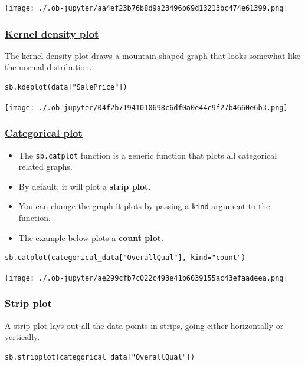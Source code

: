\documentclass[11pt]{article}
\begin{document}
\begin{center}
\texttt{[image: ./.ob-jupyter/aa4ef23b76b8d9a23496b69d13213bc474e61399.png]}
\label{orgf9e3f4a}
\end{center}

 \newpage
\subsubsection{\href{https://seaborn.pydata.org/generated/seaborn.kdeplot.html}{Kernel density plot}}
\label{sec:org62113e2}
The kernel density plot draws a mountain-shaped graph that looks somewhat like the normal distribution.
\begin{verbatim}
sb.kdeplot(data["SalePrice"])
\end{verbatim}

\begin{center}
\texttt{[image: ./.ob-jupyter/04f2b71941010698c6df0a0e44c9f27b4660e6b3.png]}
\label{org1ecc1e6}
\end{center}

 \newpage
\subsubsection{\href{https://seaborn.pydata.org/generated/seaborn.catplot.html}{Categorical plot}}
\label{sec:org4c2c2c9}
\begin{itemize}
\item The \texttt{sb.catplot} function is a generic function that plots all categorical related graphs.
\item By default, it will plot a \textbf{strip plot}.
\item You can change the graph it plots by passing a \texttt{kind} argument to the function.
\item The example below plots a \textbf{count plot}.
\end{itemize}
\begin{verbatim}
sb.catplot(categorical_data["OverallQual"], kind="count")
\end{verbatim}

\begin{center}
\texttt{[image: ./.ob-jupyter/ae299cfb7c022c493e41b6039155ac43efaadeea.png]}
\label{orge066293}
\end{center}

 \newpage
\subsubsection{\href{https://seaborn.pydata.org/generated/seaborn.stripplot.html}{Strip plot}}
\label{sec:orgeb0c3aa}
A strip plot lays out all the data points in strips, going either horizontally or vertically.
\begin{verbatim}
sb.stripplot(categorical_data["OverallQual"])
\end{verbatim}
\end{document}
